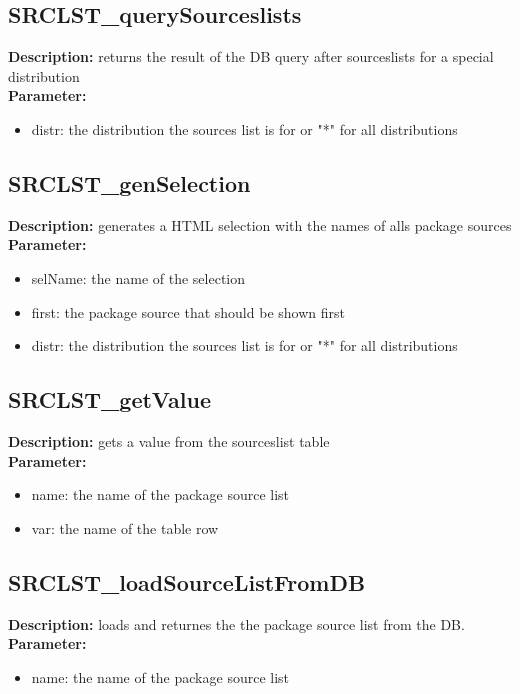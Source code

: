 \subsection{SRCLST\_querySourceslists}
\textbf{Description:} returns the result of the DB query after sourceslists for a special distribution\\
\textbf{Parameter:}
\begin{itemize}
\item distr: the distribution the sources list is for or "*" for all distributions
\end{itemize}

\subsection{SRCLST\_genSelection}
\textbf{Description:} generates a HTML selection with the names of alls package sources\\
\textbf{Parameter:}
\begin{itemize}
\item selName: the name of the selection
\item first: the package source that should be shown first
\item distr: the distribution the sources list is for or "*" for all distributions
\end{itemize}

\subsection{SRCLST\_getValue}
\textbf{Description:} gets a value from the sourceslist table\\
\textbf{Parameter:}
\begin{itemize}
\item name: the name of the package source list
\item var: the name of the table row
\end{itemize}

\subsection{SRCLST\_loadSourceListFromDB}
\textbf{Description:} loads and returnes the the package source list from the DB.\\
\textbf{Parameter:}
\begin{itemize}
\item name: the name of the package source list
\end{itemize}

